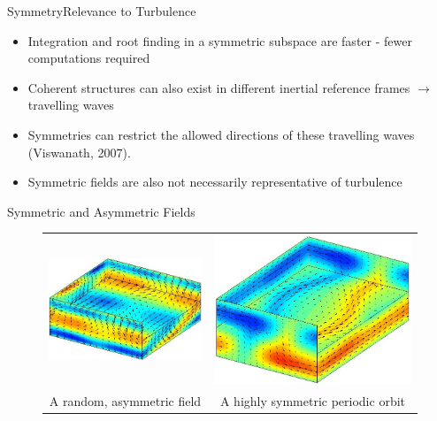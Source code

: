 \documentclass[10pt]{beamer}
\begin{document}
\begin{frame}{Symmetry}{Relevance to Turbulence}
\begin{itemize}
\item<1-> Integration and root finding in a symmetric subspace are faster - fewer computations required
\item<2-> Coherent structures can also exist in  different inertial reference frames $\rightarrow$ travelling waves
\item<3-> Symmetries can restrict the allowed directions of these travelling waves (Viswanath, 2007). 
\item<4-> Symmetric fields are also not necessarily representative of turbulence

\end{itemize}
\end{frame}
\begin{frame}{Symmetric and Asymmetric Fields}
\begin{figure}
\begin{tabular}{cc}
\includegraphics[scale=0.4]{Data/randomfield.jpg} & \includegraphics[scale=0.25]{Data/p85p47NoBase}\\
{\footnotesize A random, asymmetric field} & {\footnotesize A highly symmetric periodic orbit}
\end{tabular}
\end{figure}
\end{frame}
\end{document}
